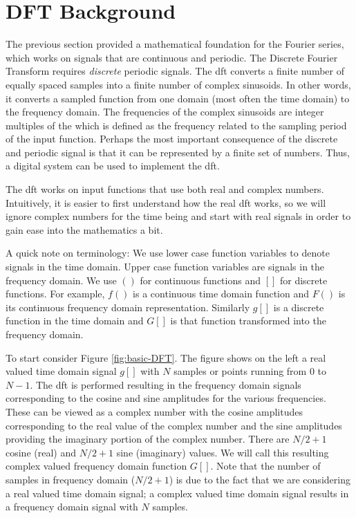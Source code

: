 \section{DFT Background}
\label{sec:DFTbackground}

The previous section provided a mathematical foundation for the Fourier series, which works on signals that are continuous and periodic. The Discrete Fourier Transform requires {\it discrete} periodic signals. The \gls{dft} converts a finite number of equally spaced samples into a finite number of complex sinusoids. In other words, it converts a sampled function from one domain (most often the time domain) to the frequency domain. The frequencies of the complex sinusoids are integer multiples of the  which is defined as the frequency related to the sampling period of the input function. Perhaps the most important consequence of the discrete and periodic signal is that it can be represented by a finite set of numbers. Thus, a digital system can be used to implement the \gls{dft}.  

The \gls{dft} works on input functions that use both real and complex numbers. Intuitively, it is easier to first understand how the real \gls{dft} works, so we will ignore complex numbers for the time being and start with real signals in order to gain ease into the mathematics a bit. 
\begin{aside}
A quick note on terminology: We use lower case function variables to denote signals in the time domain. Upper case function variables are signals in the frequency domain. We use $( )$ for continuous functions and $[ ]$ for discrete functions. For example, $f( )$ is a continuous time domain function and $F( )$ is its continuous frequency domain representation. Similarly $g[ ]$ is a discrete function in the time domain and $G[ ]$ is that function transformed into the frequency domain. 
\end{aside}

To start consider Figure \ref{fig:basic-DFT}. The figure shows on the left a real valued time domain signal $g[ ]$ with $N$ samples or points running from $0$ to $N-1$. The \gls{dft} is performed resulting in the frequency domain signals corresponding to the cosine and sine amplitudes for the various frequencies. These can be viewed as a complex number with the cosine amplitudes corresponding to the real value of the complex number and the sine amplitudes providing the imaginary portion of the complex number. There are $N/2 + 1$ cosine (real) and $N/2 + 1$ sine (imaginary) values. We will call this resulting complex valued frequency domain function $G[ ]$. Note that the number of samples in frequency domain ($N/2 + 1$) is due to the fact that we are considering a real valued time domain signal; a complex valued time domain signal results in a frequency domain signal with $N$ samples.

